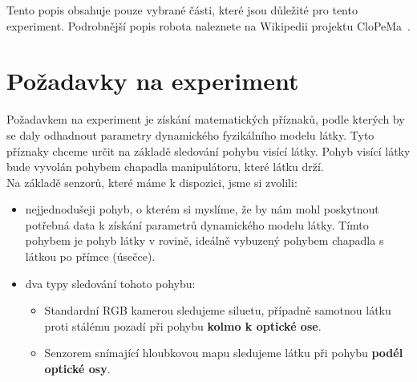 \documentclass[10pt,a4paper,titlepage,oneside]{report}
\begin{document}
\noindent Tento popis obsahuje pouze vybrané části, které jsou důležité pro tento experiment. Podrobnější popis robota naleznete na Wikipedii projektu CloPeMa~\cite{wikiDes}. \\


\section{Požadavky na experiment}
\label{sec:experiment}
Požadavkem na experiment je získání matematických příznaků, podle kterých by se daly odhadnout parametry dynamického fyzikálního modelu látky. Tyto příznaky chceme určit na základě sledování pohybu visící látky. Pohyb visící látky bude vyvolán pohybem chapadla manipulátoru, které látku drží.\\ Na základě senzorů, které máme k dispozici, jsme si zvolili:
\begin{itemize}
\item nejjednodušeji pohyb, o kterém si myslíme, že by nám mohl poskytnout potřebná data k získání parametrů dynamického modelu látky. Tímto pohybem je pohyb látky v rovině, ideálně vybuzený pohybem chapadla s látkou po přímce (úsečce). 
\item dva typy sledování tohoto pohybu:
	\begin{itemize}
		\item Standardní RGB kamerou sledujeme siluetu, případně samotnou látku proti stálému pozadí při pohybu \textbf{kolmo k optické ose}.
		\item Senzorem snímající hloubkovou mapu sledujeme látku při pohybu \textbf{podél optické osy}.
		\end{itemize}
\end{itemize}


%
\end{document}
